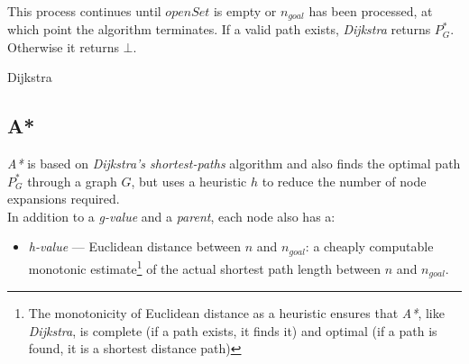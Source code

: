 \documentclass[12pt,notitlepage]{report}
\begin{document}
\\
\noindent
This process continues until $openSet$ is empty or $n_{goal}$ has been processed, at which point the algorithm terminates. If a valid path exists, {\em Dijkstra} returns $P^{*}_{G}$. Otherwise it returns $\bot$.\

\begin{algorithm}
  \SetAlgoLined\DontPrintSemicolon
  \setcounter{AlgoLine}{0}
  \caption{{\sc Dijkstra}}
\end{algorithm} 

\subsection {A*}

{\em A*} is based on {\em Dijkstra's shortest-paths} algorithm and also finds the optimal path\cite{Hart68} $P^{*}_{G}$ through a graph $G$, but uses a heuristic $h$ to reduce the number of node expansions required.\\

\noindent
In addition to a {\em g-value} and a {\em parent}, each node also has a:
\begin{itemize}
\item {\em h-value} --- Euclidean distance between {$n$} and {$n_{goal}$}: a cheaply computable monotonic estimate\footnote{The monotonicity of Euclidean distance as a heuristic ensures that {\em A*}, like {\em Dijkstra}, is complete (if a path exists, it finds it) and optimal (if a path is found, it is a shortest distance path)} of the actual shortest path length between $n$ and $n_{goal}$.
\end{itemize}
\end{document}
